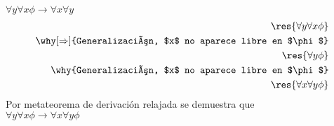 \documentclass[twoside]{article}
\begin{document}
\begin{subproof}{$\forall y \forall x \phi \to \forall x \forall y$}
    \begin{align*}
        \res{\forall y \forall x \phi}\\
    \why[\Rightarrow]{Generalización, $x$ no aparece libre en $\phi$}\\
        \res{\forall y \phi}\\
    \why{Generalización, $x$ no aparece libre en $\phi$}\\
        \res{\forall x \forall y \phi}
    \end{align*}
    Por metateorema de derivación relajada se demuestra que\\
    $\forall y \forall x \phi \to \forall x \forall y \phi$
\end{subproof}
\end{document}
